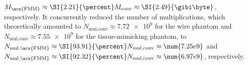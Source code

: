 $M_{\text{\acs{FMM}}} \approx \SI{2.21}{\percent} M_{\text{conv}} \approx \SI{2.49}{\gibi\byte}$,
respectively.
It concurrently reduced
the number of
multiplications, which theoretically amounted to
$N_{\text{mul},\text{conv}} \approx \num{7.72e9}$ for
the wire phantom and
$N_{\text{mul},\text{conv}} \approx \num{7.55e9}$ for
the tissue-mimicking phantom, to
$N_{\text{mul},\text{\acs{FMM}}} \approx \SI{93.91}{\percent} N_{\text{mul},\text{conv}} \approx \num{7.25e9}$ and
$N_{\text{mul},\text{\acs{FMM}}} \approx \SI{92.32}{\percent} N_{\text{mul},\text{conv}} \approx \num{6.97e9}$,
respectively.
